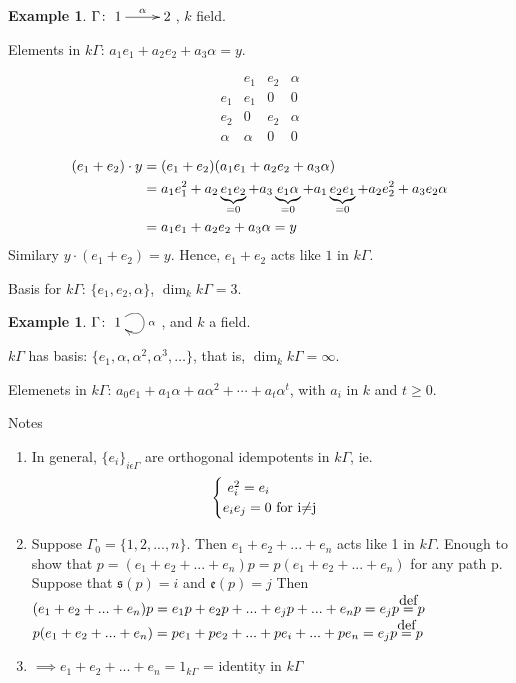 \documentclass{amsart}
\numberwithin{equation}{section}
\theoremstyle{definition}
\newtheorem{exam}[thm]{Example}
\newcommand{\G}{\Gamma}
\newcommand {\defeq}{\stackrel{\mathclap{\normalfont\mbox{def}}}{=}}
\begin{document}
\begin{exam}
$\Gamma\colon \xymatrix{1\ar[r]^\alpha & 2}$, $k$ field.  

Elements in $k\Gamma$:  $a_1e_1 + a_2e_2 + a_3\alpha = y$. 

\[\begin{array}{c||c|c|c}
      & e_1 & e_2 & \alpha \\ \hline\hline 
e_1 & e_1 &  0   &    0   \\ \hline
e_2 &   0   & e_2 &  \alpha \\ \hline
\alpha & \alpha & 0 & 0
\end{array}\]
\end{exam}
\begin{align}
(e_1 + e_2)\cdot y & = (e_1 + e_2)(a_1e_1 + a_2e_2 +
                     a_3\alpha)\notag\\
& = a_1e_1^2 + a_2\underbrace{e_1e_2}_{=0} + a_3\underbrace{e_1\alpha}_{=0} + a_1\underbrace{e_2e_1}_{=0} + a_2e_2^2 + a_3
  e_2\alpha\notag\\
& = a_1e_1 + a_2e_2 + a_3\alpha = y\notag
\end{align} 
Similary $y\cdot (e_1 + e_2) = y$.  Hence,  $e_1 + e_2$ acts like $1$
in $k\Gamma$. 

Basis for $k\Gamma$: $\{ e_1, e_2, \alpha\}$, $\dim_kk\Gamma = 3$.

\begin{exam}
$\Gamma\colon \xymatrix{1\ar@(ur,dr)[]^\alpha}$, and $k$ a field.

$k\Gamma$ has basis: $\{e_1, \alpha, \alpha^2, \alpha^3, \ldots\}$,
that is, $\dim_k k\Gamma = \infty$. 

Elemenets in $k\Gamma$: $a_0e_1 + a_1\alpha + a\alpha^2 + \cdots +
a_t\alpha^t$, with $a_i$ in $k$ and $t\geqslant 0$.  
\end{exam}

Notes
\begin{enumerate}
	\item  In general, $\{e_i\}_{i\epsilon\G}$ are orthogonal idempotents in $k\Gamma$, ie. 
	\[ \begin{cases}\text{\ $e_i^2 = e_i$}\notag\\
	\text{$e_ie_j = 0$ for i$\neq$j}\notag
	\end{cases}\]
	
	\item Suppose $\G_0 = \{1,2,...,n\}$. Then $e_1 + e_2 + ... + e_n$ acts like 1 in $k\G$. Enough to show that $p = (e_1 + e_2 + ... + e_n)p = p(e_1 + e_2 + ... + e_n)$ for any path p. Suppose that $\mathfrak{s}(p) = i$ and $\mathfrak{e}(p) = j$ Then
	\newline $(e_1 + e_2 + ... + e_n)p = e_1p + e_2p + ... + e_jp + ... + e_np = e_jp \defeq p$ \newline
	\newline $p(e_1 + e_2 + ... + e_n) = pe_1 + pe_2 + ... + pe_i + ... + pe_n = e_jp \defeq p$ \newline
	
	\item $\implies e_1 + e_2 + ... + e_n = 1_{k\G}$ = identity in $k\G$ 
\end{enumerate}
\end{document}
